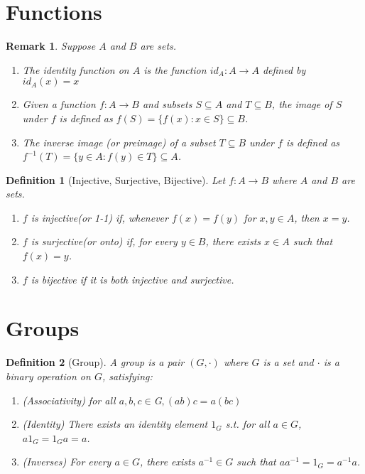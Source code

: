 \documentclass[12pt]{article}
\newtheorem{definition}{Definition}[section]
\newtheorem{remark}{Remark}[section]
\begin{document}
\section{Functions}

\begin{remark}
    Suppose $A$ and $B$ are sets.
    \begin{enumerate}
        \item The identity function on $A$ is the function $id_A : A \to A$ defined by $id_A(x) = x$
        \item Given a function $f : A \to B$ and subsets $S \subseteq A$ and $T \subseteq B$, the image of $S$ under $f$ is defined as $f(S) = \{ f(x) : x \in S \} \subseteq B$.
        \item The inverse image (or preimage) of a subset $T \subseteq B$ under $f$ is defined as $f^{-1}(T) = \{ y \in A : f(y) \in T \} \subseteq A$.
    \end{enumerate}
\end{remark}

\begin{definition}[Injective, Surjective, Bijective]
Let $f : A \to B$ where $A$ and $B$ are sets.
\begin{enumerate}
    \item $f$ is \emph{injective}(or 1-1) if, whenever $f(x) = f(y)$ for $x, y \in A$, then $x = y$.
    \item $f$ is \emph{surjective}(or onto) if, for every $y \in B$, there exists $x \in A$ such that $f(x) = y$.
    \item $f$ is \emph{bijective} if it is both injective and surjective.
\end{enumerate}
\end{definition}

\section{Groups}

\begin{definition}[Group]
A \emph{group} is a pair $(G, \cdot)$ where $G$ is a set  and $\cdot$ is a binary operation on $G$, satisfying:
\begin{enumerate}
    \item (Associativity) for all $a,b,c \in $G$, (ab)c = a(bc)$ 
    \item (Identity) There exists an identity element $1_G$ s.t. for all $a \in G$, $a1_G = 1_G a = a$.
    \item (Inverses) For every $a \in G$, there exists $a^{-1} \in G$ such that $aa^{-1} = 1_G = a^{-1}a$.
\end{enumerate}
\end{definition}
\end{document}
